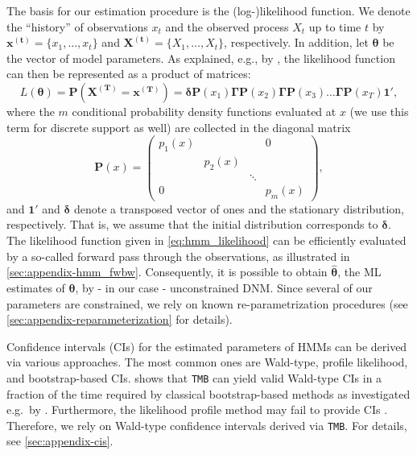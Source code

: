 \documentclass[]{interact}\usepackage[]{graphicx}\usepackage[dvipsnames]{xcolor}
\theoremstyle{plain}%
\theoremstyle{definition}
\theoremstyle{remark}
\begin{document}
The basis for our estimation procedure is the (log-)likelihood function. We denote the ``history'' of observations $x_t$ and the observed process $X_t$ up to time $t$ by $\bm{x^{(t)}} = \{x_1, \ldots, x_t \}$ and $\bm{X^{(t)}} = \{X_1, \ldots, X_t \}$, respectively. In addition, let $\bm{\theta}$ be the vector of model parameters. As explained, e.g., by \cite[p.~37]{zucchini}, the likelihood function can then be represented as a product of matrices:  
\begin{equation}
\label{eq:hmm_likelihood}
L(\bm{\theta}) = \bm{P}(\bm{X^{(T)}} = \bm{x^{(T)}}) = \bm{\delta} \bm{P}(x_1) \bm{\Gamma} \bm{P}(x_2) \bm{\Gamma} \bm{P}(x_3) \ldots \bm{\Gamma} \bm{P}(x_T) \bm{1}',
\end{equation}
where the $m$ conditional probability density functions evaluated at $x$ (we use this term for discrete support as well) are collected in the diagonal matrix
\begin{equation*}
\bm{P}(x) = \begin{pmatrix}
p_1(x)    &         &         & 0\\
          & p_2(x)  &         &\\
          &         & \ddots  &\\
0         &         &         & p_m(x)
\end{pmatrix},
\end{equation*}
and $\bm{1}'$ and $\bm{\delta}$ denote a transposed vector of ones and the stationary distribution, respectively. That is, we assume that the initial distribution corresponds to $\bm{\delta}$. %
The likelihood function given in \autoref{eq:hmm_likelihood} can be efficiently evaluated by a so-called forward pass through the observations, as illustrated in \autoref{sec:appendix-hmm_fwbw}. Consequently, it is possible to obtain $\hat{\bm{\theta}}$, the ML estimates of $\bm{\theta}$, by - in our case - unconstrained DNM. Since several of our parameters are constrained, we rely on known re-parametrization procedures (see \autoref{sec:appendix-reparameterization} for details).

Confidence intervals (CIs) for the estimated parameters of HMMs can be derived via various approaches. The most common ones are Wald-type, profile likelihood, and bootstrap-based CIs. \cite{bacri} shows that {\tt{TMB}} can yield valid Wald-type CIs in a fraction of the time required by classical bootstrap-based methods as investigated e.g.~by \cite{bulla, zucchini}. Furthermore, the likelihood profile method may fail to provide CIs \citep{bacri}. Therefore, we rely on Wald-type confidence intervals derived via {\tt{TMB}}. For details, see \autoref{sec:appendix-cis}.
\end{document}
